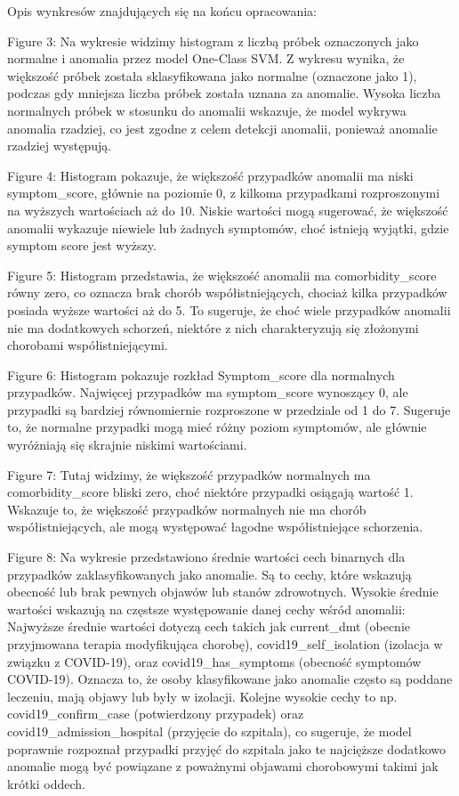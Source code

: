 \documentclass[a4paper,fleqn]{cas-dc}
\begin{document}
Opis wynkresów znajdujących się na końcu opracowania:

Figure 3: Na wykresie widzimy histogram z liczbą próbek oznaczonych jako normalne i anomalia przez model One-Class SVM.
Z wykresu wynika, że większość próbek została sklasyfikowana jako normalne (oznaczone jako 1), podczas gdy mniejsza liczba próbek została uznana za anomalie.
Wysoka liczba normalnych próbek w stosunku do anomalii wskazuje, że model wykrywa anomalia rzadziej, co jest zgodne z celem detekcji anomalii, ponieważ anomalie rzadziej występują.


Figure 4: Histogram pokazuje, że większość przypadków anomalii ma niski symptom\_score, głównie na poziomie 0, z kilkoma przypadkami rozproszonymi na wyższych wartościach aż do 10. Niskie wartości mogą sugerować, że większość anomalii wykazuje niewiele lub żadnych symptomów, choć istnieją wyjątki, gdzie symptom score jest wyższy.


Figure 5: Histogram przedstawia, że większość anomalii ma comorbidity\_score równy zero, co oznacza brak chorób współistniejących, chociaż kilka przypadków posiada wyższe wartości aż do 5. To sugeruje, że choć wiele przypadków anomalii nie ma dodatkowych schorzeń, niektóre z nich charakteryzują się złożonymi chorobami współistniejącymi.


Figure 6: Histogram pokazuje rozkład Symptom\_score dla normalnych przypadków. Najwięcej przypadków ma symptom\_score wynoszący 0, ale przypadki są bardziej równomiernie rozproszone w przedziale od 1 do 7. Sugeruje to, że normalne przypadki mogą mieć różny poziom symptomów, ale głównie wyróżniają się skrajnie niskimi wartościami.


Figure 7: Tutaj widzimy, że większość przypadków normalnych ma comorbidity\_score bliski zero, choć niektóre przypadki osiągają wartość 1. Wskazuje to, że większość przypadków normalnych nie ma chorób współistniejących, ale mogą występować łagodne współistniejące schorzenia.

Figure 8: Na wykresie przedstawiono średnie wartości cech binarnych dla przypadków zaklasyfikowanych jako anomalie. Są to cechy, które wskazują obecność lub brak pewnych objawów lub stanów zdrowotnych. Wysokie średnie wartości wskazują na częstsze występowanie danej cechy wśród anomalii:
Najwyższe średnie wartości dotyczą cech takich jak current\_dmt (obecnie przyjmowana terapia modyfikująca chorobę), covid19\_self\_isolation (izolacja w związku z COVID-19), oraz covid19\_has\_symptoms (obecność symptomów COVID-19). Oznacza to, że osoby klasyfikowane jako anomalie często są poddane leczeniu, mają objawy lub były w izolacji.
Kolejne wysokie cechy to np. covid19\_confirm\_case (potwierdzony przypadek) oraz covid19\_admission\_hospital (przyjęcie do szpitala), co sugeruje, że model poprawnie rozpoznał przypadki przyjęć do szpitala jako te najcięższe dodatkowo anomalie mogą być powiązane z poważnymi objawami chorobowymi takimi jak krótki oddech.
\end{document}
